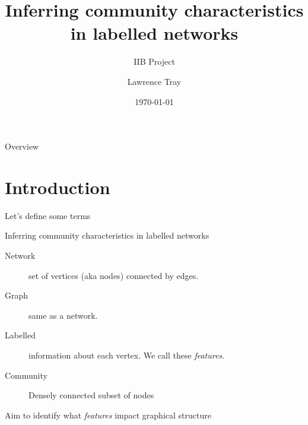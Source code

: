 \documentclass{beamer}
\title{Inferring community characteristics in labelled networks}
\subtitle{IIB Project}
\author{Lawrence Tray}
\institute{Ioannis Kontoyiannis}
\date{\today}
\begin{document}
	
	\begin{frame}
		\titlepage
	\end{frame}

	\begin{frame}{Overview}
		\tableofcontents
	\end{frame}

\section{Introduction}
	
	\begin{frame}{Let's define some terms}
		\begin{block}{Inferring community characteristics in labelled networks}
			\begin{description}
				\item[Network] set of vertices (aka nodes) connected by edges.
				\item[Graph] same as a network.
				\item[Labelled] information about each vertex. We call these {\em features}.
				\item[Community] Densely connected subset of nodes
			\end{description}
		\end{block}
		\centering
		\vspace{1cm}
		Aim to identify what {\em features} impact graphical structure
	\end{frame}
	
\end{document}
